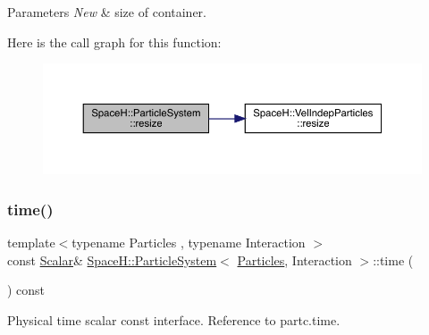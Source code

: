 \begin{DoxyParams}{Parameters}
{\em New} & size of container. \\
\hline
\end{DoxyParams}
Here is the call graph for this function\+:
\nopagebreak
\begin{figure}[H]
\begin{center}
\leavevmode
\includegraphics[width=350pt]{class_space_h_1_1_particle_system_af485828ec5712726054b377e9c135d39_cgraph}
\end{center}
\end{figure}
\mbox{\label{class_space_h_1_1_particle_system_a3c4c4ef7509d5c19d565ffad4bf5286a}} 
\subsubsection{\texorpdfstring{time()}{time()}}
{\footnotesize\ttfamily template$<$typename Particles , typename Interaction $>$ \\
const \mbox{\hyperlink{class_space_h_1_1_particle_system_a522770dcfaf8b29aed35ea9348185a34}{Scalar}}\& \mbox{\hyperlink{class_space_h_1_1_particle_system}{Space\+H\+::\+Particle\+System}}$<$ \mbox{\hyperlink{struct_space_h_1_1_particles}{Particles}}, Interaction $>$\+::time (\begin{DoxyParamCaption}{ }\end{DoxyParamCaption}) const\hspace{0.3cm}{\ttfamily [inline]}}



Physical time scalar const interface. Reference to partc.\+time. 

